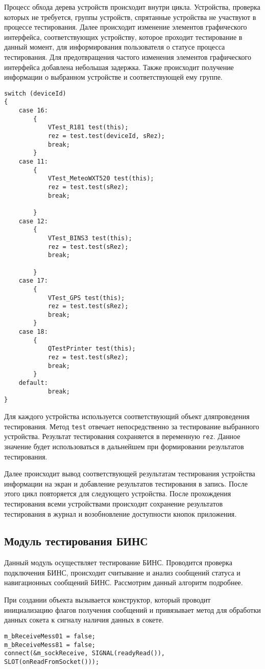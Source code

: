 Процесс обхода дерева устройств происходит внутри цикла. Устройства, проверка которых не требуется, группы устройств,
спрятанные устройства  не участвуют в процессе тестирования. Далее происходит изменение элементов графического
интерфейса, соответствующих устройству, которое проходит тестирование в данный момент, для информирования пользователя о
статусе процесса тестирования. Для предотвращения частого изменения элементов графического интерфейса добавлена
небольшая задержка. Также происходит получение информации о выбранном устройстве и соответствующей ему группе.
\medskip
\begin{verbatim}
switch (deviceId)
{
	case 16:
		{
			VTest_R181 test(this);
			rez = test.test(deviceId, sRez);
			break;
		}
	case 11:
		{
			VTest_MeteoWXT520 test(this);
			rez = test.test(sRez);
			break;

		}
	case 12:
		{
			VTest_BINS3 test(this);
			rez = test.test(sRez);
			break;

		}
	case 17:
		{
			VTest_GPS test(this);
			rez = test.test(sRez);
			break;
		}
	case 18:
		{
			QTestPrinter test(this);
			rez = test.test(sRez);
			break;
		}
	default:
			break;
}
\end{verbatim}
\medskip

Для каждого устройства используется соответствующий объект для\break проведения тестирования. Метод \texttt{test} отвечает
непосредственно за тестирование выбранного устройства. Результат тестирования сохраняется в переменную \texttt{rez}.
Данное значение будет использоваться в дальнейшем при формировании результатов тестирования.

Далее происходит вывод соответствующей результатам тестирования устройства информации на экран и добавление результатов
тестирования в запись. После этого цикл повторяется для следующего устройства. После прохождения тестирования всеми
устройствами происходит сохранение результатов тестирования в журнал и возобновление доступности кнопок приложения.

\subsection{Модуль тестирования БИНС}
Данный модуль осуществляет тестирование БИНС. Проводится проверка подключения БИНС, происходит считывание и анализ
сообщений статуса и навигационных сообщений БИНС. Рассмотрим данный алгоритм подробнее.

При создании объекта вызывается конструктор, который проводит инициализацию флагов получения сообщений и привязывает
метод для обработки данных сокета к сигналу наличия данных в сокете.
\medskip
\begin{verbatim}
m_bReceiveMess01 = false;
m_bReceiveMess81 = false;
connect(&m_sockReceive, SIGNAL(readyRead()), SLOT(onReadFromSocket()));
\end{verbatim}
\medskip

